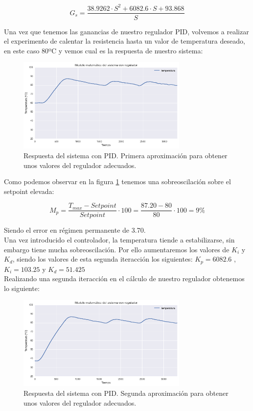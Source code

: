 $$G_s = \frac{38.9262 \cdot S^2 + 6082.6 \cdot S + 93.868}{S}$$

Una vez que tenemos las ganancias de nuestro regulador PID, volvemos a realizar el experimento de calentar la resistencia hasta un valor de temperatura deseado, en este caso 80ºC y vemos cual es la respuesta de nuestro sistema:

\begin{figure}[H]
    \centering
    \includegraphics[width=0.75\textwidth]{images/PLC/modelado/modelado_26_1.png}
    \caption[Respuesta del sistema con PID iteracción 1.]{Respuesta del sistema con PID. Primera aproximación para obtener unos valores del regulador adecuados.}
    \label{fig:plc_PID1}
\end{figure}

Como podemos observar en la figura \ref{fig:plc_PID1} tenemos una sobreoscilación sobre el setpoint elevada:

$$M_{p}=\frac{T_{max}-Setpoint}{Setpoint} \cdot 100 = \frac{87.20-80}{80} \cdot 100 = 9\%$$ 

Siendo el error en régimen  permanente de 3.70.\\

Una vez introducido el controlador, la temperatura tiende a estabilizarse, sin embargo tiene mucha sobreoscilación. Por ello aumentaremos los valores de $K_i$ y $K_d$, siendo los valores de esta segunda iteracción los siguientes:
$K_p = 6082.6$ ,$K_i=103.25$ y $K_d=51.425$\\

Realizando una segunda iteracción en el cálculo de nuestro regulador obtenemos lo siguiente:

\begin{figure}[H]
    \centering
    \includegraphics[width=0.75\textwidth]{images/PLC/modelado/modelado_30_1.png}
    \caption[Respuesta del sistema con PID. Iteracción 2]{Respuesta del sistema con PID. Segunda aproximación para obtener unos valores del regulador adecuados.}
    \label{fig:plc_PID2}
\end{figure}

